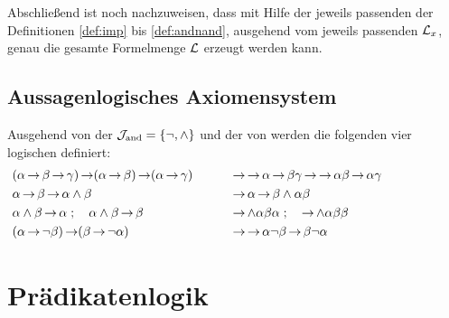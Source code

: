 Abschließend ist noch nachzuweisen, dass mit Hilfe der jeweils passenden der Definitionen \eqref{def:imp} bis \eqref{def:andnand}, ausgehend vom jeweils passenden $\mathcal{L}_x$, genau die gesamte Formelmenge $\mathcal{L}$ erzeugt werden kann.

\subsection{Aussagenlogisches Axiomensystem}%
\label{sub:ausAxiome}

Ausgehend von der  $\mathcal{J}_{\mathrm{and}} = \{\lnot, \land\}$ und der  von \symqt{\limp} werden die folgenden vier logischen  definiert:
\begin{align}
	&
	(\alpha\operatorname{\rightarrow}\beta\operatorname{\rightarrow}\gamma)\operatorname{\rightarrow}(\alpha\operatorname{\rightarrow}\beta)\operatorname{\rightarrow}(\alpha\operatorname{\rightarrow}\gamma)
	&&&& &
	& \operatorname{\rightarrow}\operatorname{\rightarrow}\alpha\operatorname{\rightarrow}\beta\gamma\operatorname{\rightarrow}\operatorname{\rightarrow}\alpha\beta\operatorname{\rightarrow}\alpha\gamma \\
	& \alpha \operatorname{\rightarrow} \beta \operatorname{\rightarrow} \alpha \land \beta
	&&&& &
	& \operatorname{\rightarrow} \alpha \operatorname{\rightarrow} \beta \land \alpha \beta \\
	& \alpha \land \beta \operatorname{\rightarrow} \alpha \;; \quad \alpha \land \beta \operatorname{\rightarrow} \beta
	&&&& &
	& \operatorname{\rightarrow} \land \alpha \beta \alpha \;; \quad \operatorname{\rightarrow} \land \alpha \beta \beta\\
	&(\alpha \operatorname{\rightarrow} \lnot \beta) \operatorname{\rightarrow} (\beta \operatorname{\rightarrow} \lnot \alpha)
	&&&& &
	& \operatorname{\rightarrow} \operatorname{\rightarrow} \alpha \lnot \beta \operatorname{\rightarrow} \beta \lnot \alpha
	&&&&&&&&&&
\end{align}
%

\section{Prädikatenlogik}%
\label{sec:Praedikatenlogik}


